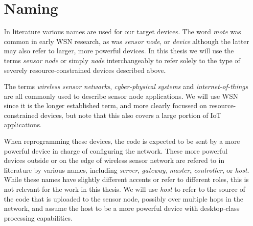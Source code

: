 \section{Naming}
In literature various names are used for our target devices. The word \emph{mote} was common in early WSN research, as was \emph{sensor node}, or \emph{device} although the latter may also refer to larger, more powerful devices. In this thesis we will use the terms \emph{sensor node} or simply \emph{node} interchangeably to refer solely to the type of severely resource-constrained devices described above.

The terms \emph{wireless sensor networks}, \emph{cyber-physical systems} and \emph{internet-of-things} are all commonly used to describe sensor node applications. We will use WSN since it is the longer established term, and more clearly focussed on resource-constrained devices, but note that this also covers a large portion of IoT applications.

When reprogramming these devices, the code is expected to be sent by a more powerful device in charge of configuring the network. These more powerful devices outside or on the edge of wireless sensor network are refered to in literature by various names, including \emph{server}, \emph{gateway}, \emph{master}, \emph{controller}, or \emph{host}. While these names have slightly different accents or refer to different roles, this is not relevant for the work in this thesis. We will use \emph{host} to refer to the source of the code that is uploaded to the sensor node, possibly over multiple hops in the network, and assume the host to be a more powerful device with desktop-class processing capabilities.


